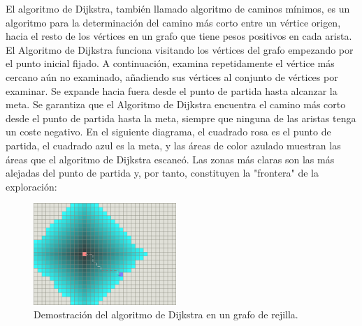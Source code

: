 \documentclass[reprint,amsmath,amssymb,aps]{revtex4-2}
\begin{document}

% 

El algoritmo de Dijkstra, también llamado algoritmo de caminos mínimos, es un algoritmo para la determinación del camino más corto entre un vértice origen, hacia el resto de los vértices en un grafo que tiene pesos positivos en cada arista. El Algoritmo de Dijkstra funciona visitando los vértices del grafo empezando por el punto inicial fijado. A continuación, examina repetidamente el vértice más cercano aún no examinado, añadiendo sus vértices al conjunto de vértices por examinar. Se expande hacia fuera desde el punto de partida hasta alcanzar la meta. Se garantiza que el Algoritmo de Dijkstra encuentra el camino más corto desde el punto de partida hasta la meta, siempre que ninguna de las aristas tenga un coste negativo. En el siguiente diagrama, el cuadrado rosa es el punto de partida, el cuadrado azul es la meta, y las áreas de color azulado muestran las áreas que el algoritmo de Dijkstra escaneó. Las zonas más claras son las más alejadas del punto de partida y, por tanto, constituyen la "frontera" de la exploración:

\begin{figure}[H]
 	\centering
 	\includegraphics[width=0.48\textwidth]{dijkstra.png}
 	\caption{Demostración del algoritmo de Dijkstra en un grafo de rejilla.}
 	\label{dijkstra}
\end{figure}
\end{document}
